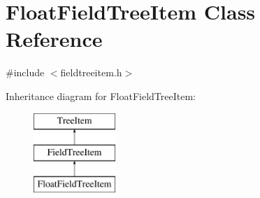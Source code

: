 \hypertarget{class_float_field_tree_item}{\section{\-Float\-Field\-Tree\-Item \-Class \-Reference}
\label{class_float_field_tree_item}
}


{\ttfamily \#include $<$fieldtreeitem.\-h$>$}

\-Inheritance diagram for \-Float\-Field\-Tree\-Item\-:\begin{figure}[H]
\begin{center}
\leavevmode
\includegraphics[height=3.000000cm]{class_float_field_tree_item}
\end{center}
\end{figure}
